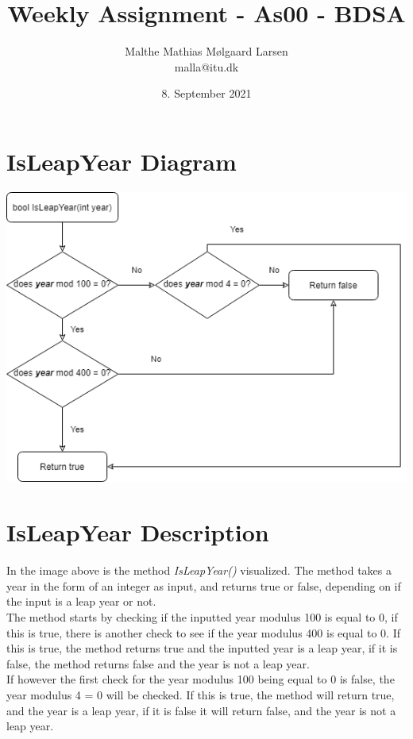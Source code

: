 \documentclass{article}
\title{Weekly Assignment - As00 - BDSA}
\author{Malthe Mathias Mølgaard Larsen \\ malla@itu.dk }
\date{8. September 2021}
\begin{document}
\maketitle

\section{IsLeapYear Diagram}

\includegraphics[scale=0.7]{images/LeapYearFlow.png}
\newpage
\section{IsLeapYear Description}
In the image above is the method \emph{IsLeapYear()} visualized. The method takes a year in the form of an integer as input, and returns true or false, depending on if the input is a leap year or not.\\
The method starts by checking if the inputted year modulus 100 is equal to 0, if this is true, there is another check to see if the year modulus 400 is equal to 0. If this is true, the method returns true and the inputted year is a leap year, if it is false, the method returns false and the year is not a leap year. \\
If however the first check for the year modulus 100 being equal to 0 is false, the year modulus 4 = 0 will be checked. If this is true, the method will return true, and the year is a leap year, if it is false it will return false, and the year is not a leap year.
\end{document}
